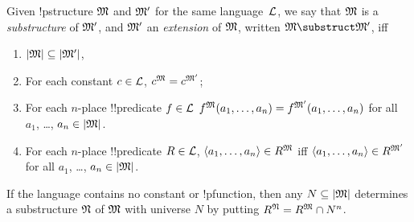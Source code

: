 \documentclass[../../include/open-logic-section]{subfiles}
\begin{document}

\begin{defn}
Given !p{structure} $\mathfrak M$ and $\mathfrak M'$ for the same language~$\mathcal L$,
we say that $\mathfrak M$ is a \emph{substructure} of $\mathfrak M'$, and
$\mathfrak M'$ an \emph{extension} of $\mathfrak M$, written $\Struct M
\substruct \Struct M'$, iff
\begin{enumerate}
\item $\left| \mathfrak M \right| \subseteq \left| \mathfrak M' \right|$,
\item For each constant $c \in \mathcal L$, $c^{\mathfrak M} =
    c^{\mathfrak M'}$;
\item For each $n$-place !!{predicate} $f \in \mathcal L$
  $f^{\mathfrak M}(a_1, \dots, a_n) = f^{\mathfrak M'}(a_1, \dots, a_n)$
  for all $a_1$, \dots, $a_n \in \left| \mathfrak M \right|$.
\item For each $n$-place !!{predicate} $R \in \mathcal L$, $\langle
  a_1, \dots, a_n\rangle \in R^{\mathfrak M}$ iff $\langle a_1, \dots,
  a_n\rangle \in R^{\mathfrak M'}$ for all $a_1$, \dots, $a_n \in
  \left| \mathfrak M \right|$.
\end{enumerate}
\end{defn}

\begin{rem}
If the language contains no constant or !p{function}, then any $N
\subseteq \left| \mathfrak M \right|$ determines a substructure $\mathfrak N$ of
$\mathfrak M$ with universe $N$ by putting $R^{\mathfrak N} =
R^{\mathfrak M} \cap N^n$.
\end{rem}

\end{document}
